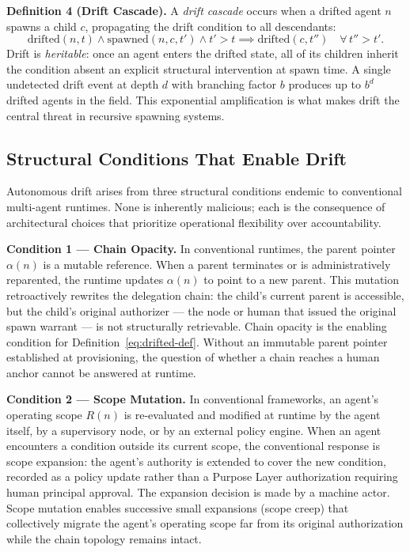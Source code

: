 \medskip
\noindent\textbf{Definition 4 (Drift Cascade).}
A \emph{drift cascade} occurs when a drifted agent $n$ spawns a child $c$, propagating the drift condition to all descendants:
\begin{equation}
\mathrm{drifted}(n, t) \land \mathrm{spawned}(n, c, t') \land t' > t \implies \mathrm{drifted}(c, t'') \quad \forall\, t'' > t'.
\label{eq:drift-cascade}
\end{equation}
Drift is \emph{heritable}: once an agent enters the drifted state, all of its children inherit the condition absent an explicit structural intervention at spawn time. A single undetected drift event at depth $d$ with branching factor $b$ produces up to $b^d$ drifted agents in the field. This exponential amplification is what makes drift the central threat in recursive spawning systems.

\subsection{Structural Conditions That Enable Drift}
\label{sec:rs-drift-conditions}

Autonomous drift arises from three structural conditions endemic to conventional multi-agent runtimes. None is inherently malicious; each is the consequence of architectural choices that prioritize operational flexibility over accountability.

\medskip
\noindent\textbf{Condition 1 — Chain Opacity.}
In conventional runtimes, the parent pointer $\alpha(n)$ is a mutable reference. When a parent terminates or is administratively reparented, the runtime updates $\alpha(n)$ to point to a new parent. This mutation retroactively rewrites the delegation chain: the child's current parent is accessible, but the child's original authorizer — the node or human that issued the original spawn warrant — is not structurally retrievable. Chain opacity is the enabling condition for Definition~\ref{eq:drifted-def}. Without an immutable parent pointer established at provisioning, the question of whether a chain reaches a human anchor cannot be answered at runtime.

\medskip
\noindent\textbf{Condition 2 — Scope Mutation.}
In conventional frameworks, an agent's operating scope $R(n)$ is re-evaluated and modified at runtime by the agent itself, by a supervisory node, or by an external policy engine. When an agent encounters a condition outside its current scope, the conventional response is scope expansion: the agent's authority is extended to cover the new condition, recorded as a policy update rather than a Purpose Layer authorization requiring human principal approval. The expansion decision is made by a machine actor. Scope mutation enables successive small expansions (scope creep) that collectively migrate the agent's operating scope far from its original authorization while the chain topology remains intact.

